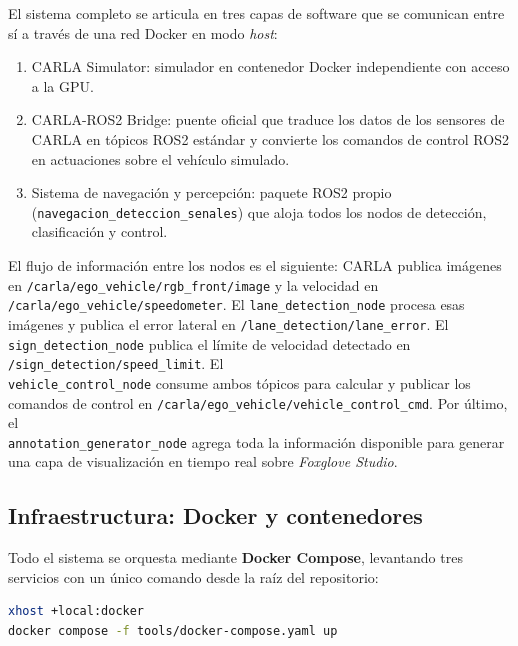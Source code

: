 \documentclass[12pt, a4paper]{article}
\begin{document}
El sistema completo se articula en tres capas de software que se comunican entre sí a través de una red Docker en modo \textit{host}:

\begin{enumerate}
    \item CARLA Simulator: simulador en contenedor Docker independiente con acceso a la GPU.
    \item CARLA-ROS2 Bridge: puente oficial que traduce los datos de los sensores de CARLA en tópicos ROS2 estándar y convierte los comandos de control ROS2 en actuaciones sobre el vehículo simulado.
    \item Sistema de navegación y percepción: paquete ROS2 propio \\ (\texttt{navegacion\_deteccion\_senales}) que aloja todos los nodos de detección, clasificación y control.
\end{enumerate}

El flujo de información entre los nodos es el siguiente: CARLA publica imágenes en \texttt{/carla/ego\_vehicle/rgb\_front/image} y la velocidad en \\ \texttt{/carla/ego\_vehicle/speedometer}. El \texttt{lane\_detection\_node} procesa esas imágenes y publica el error lateral en \texttt{/lane\_detection/lane\_error}. El \texttt{sign\_detection\_node} publica el límite de velocidad detectado en \texttt{/sign\_detection/speed\_limit}. El \\ \texttt{vehicle\_control\_node} consume ambos tópicos para calcular y publicar los comandos de control en \texttt{/carla/ego\_vehicle/vehicle\_control\_cmd}. Por último, el \\ \texttt{annotation\_generator\_node} agrega toda la información disponible para generar una capa de visualización en tiempo real sobre \textit{Foxglove Studio}.

\subsection{Infraestructura: Docker y contenedores}

Todo el sistema se orquesta mediante \textbf{Docker Compose}, levantando tres servicios con un único comando desde la raíz del repositorio:

\vspace{0.3cm}
\begin{lstlisting}[language=bash]
xhost +local:docker
docker compose -f tools/docker-compose.yaml up
\end{lstlisting}
\end{document}
